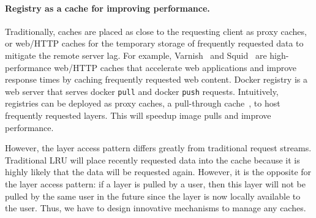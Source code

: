 \paragraph{Registry as a cache for improving performance.}
Traditionally, caches are placed as close to the requesting client as 
proxy caches, or web/HTTP caches for the temporary storage of 
frequently requested data to mitigate the remote server lag. 
For example, Varnish~\cite{varnish} and Squid~\cite{squid} are high-performance web/HTTP caches that accelerate web applications and improve response times by caching frequently requested web content.
Docker registry is a web server that serves docker \texttt{pull} and docker \texttt{push} requests.
Intuitively, registries can be deployed as proxy caches, \ie a pull-through cache~\cite{registryascache}, to host frequently requested layers. This will speedup image pulls and improve performance. 

However, the layer access pattern differs greatly from traditional request streams.
Traditional LRU will place recently requested data into the cache 
because it is highly likely that the data will be requested again.
However, it is the opposite for the layer access pattern: if a layer is pulled by a user,
then this layer will not be pulled by the same user in the future
since the layer is now locally available to the user. Thus, we have to design innovative mechanisms to manage any caches.




